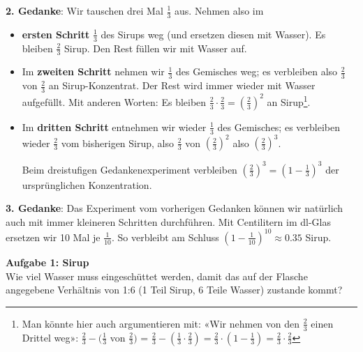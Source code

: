 \textbf{2. Gedanke}: Wir tauschen drei Mal $\frac13$ aus. Nehmen also im
\begin{itemize}
\item \textbf{ersten Schritt} $\frac13$ des Sirups weg (und ersetzen diesen mit Wasser).
  Es bleiben $\frac23$ Sirup. Den Rest füllen wir mit Wasser auf.
\item Im \textbf{zweiten Schritt} nehmen wir $\frac13$ des Gemisches
weg; es verbleiben also $\frac23$ von $\frac23$ an
Sirup-Konzentrat. Der Rest wird immer wieder mit Wasser aufgefüllt. Mit
anderen Worten: Es bleiben $\frac23 \cdot \frac23
= \left(\frac23\right)^2$ an Sirup\footnote{Man könnte hier auch argumentieren mit: «Wir nehmen von den $\frac23$ einen Drittel weg»: $\frac23 - (\frac13$ von $\frac23)$ = $\frac23 - (\frac13 \cdot\frac23) = \frac23 \cdot(1-\frac13)=\frac23\cdot\frac23$}.
\item Im \textbf{dritten Schritt} entnehmen wir wieder $\frac13$ des
Gemisches; es verbleiben wieder $\frac23$ vom bisherigen Sirup, also
$\frac23$ von $(\frac23)^2$ also $\left(\frac23\right)^3$.

Beim dreistufigen Gedankenexperiment verbleiben
$\left(\frac23\right)^3 = \left(1-\frac13\right)^3$ der ursprünglichen Konzentration.
\end{itemize}
\leserluft

\textbf{3. Gedanke}: Das Experiment vom vorherigen Gedanken können wir natürlich auch mit immer kleineren Schritten durchführen.
Mit Centilitern \zB im dl-Glas ersetzen wir 10 Mal je $\frac1{10}$. 
So verbleibt am Schluss $\left(1-\frac{1}{10}\right)^{10}\approx 0.35$ Sirup.

\newpage

\textbf{Aufgabe 1: Sirup}\\
Wie viel Wasser muss eingeschüttet werden, damit das auf der Flasche
angegebene Verhältnis von 1:6 (1 Teil Sirup, 6 Teile Wasser) zustande
kommt?


